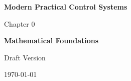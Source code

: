 \documentclass[11pt,letterpaper]{book}
\begin{document}
\begin{titlepage}
\centering
\vspace*{3cm}

{\Huge\bfseries\color{chaptercolor} Modern Practical Control Systems \par}
\vspace{1cm}
{\Large Chapter 0 \par}
\vspace{0.5cm}
{\LARGE\bfseries Mathematical Foundations \par}

\vspace{3cm}

{\Large \authorname \par}
\vspace{0.3cm}
{\large \authordepartment \par}
{\large \authorinstitution \par}

\vfill

{\large Draft Version \par}
{\large \today \par}
\end{titlepage}

\tableofcontents
\newpage


\end{document}
